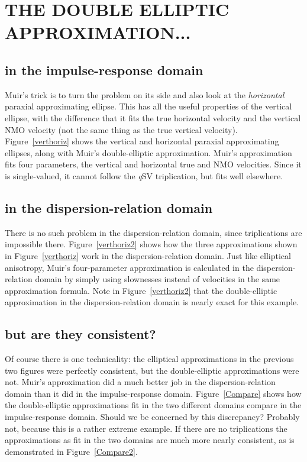 \section{THE DOUBLE ELLIPTIC APPROXIMATION...}
\subsection{in the impulse-response domain}
Muir's trick is to turn the problem on its side and also look at the
{\em horizontal\/} paraxial approximating ellipse. This has all the
useful properties of the vertical ellipse, with the difference
that it fits the true horizontal velocity and the vertical NMO velocity
(not the same thing as the true vertical velocity).
Figure~\ref{verthoriz} shows the vertical and horizontal
paraxial approximating ellipses, along with
Muir's double-elliptic approximation. Muir's approximation fits
four parameters, the vertical and horizontal true and NMO velocities.
Since it is single-valued, it cannot follow the {\sl q}SV triplication,
but fits well elsewhere.

\subsection{in the dispersion-relation domain}
There is no such problem in the dispersion-relation domain, since
triplications are impossible there.
Figure~\ref{verthoriz2} shows how the three approximations shown
in Figure~\ref{verthoriz} work in the dispersion-relation domain.
Just like elliptical anisotropy,
Muir's four-parameter approximation is calculated
in the dispersion-relation domain
by simply using slownesses instead of velocities
in the same approximation formula.
Note in Figure~\ref{verthoriz2} that the
double-elliptic approximation in the dispersion-relation domain
is nearly exact for this example.

\subsection{but are they consistent?}
Of course there is one technicality: the elliptical approximations in
the previous two figures were perfectly consistent, but the double-elliptic
approximations were not. Muir's approximation did a much better job
in the dispersion-relation domain than it did in the impulse-response domain.
Figure~\ref{Compare} shows how the double-elliptic approximations
fit in the two different domains compare in the impulse-response domain.
Should we be concerned by this discrepancy?
Probably not, because this is a rather extreme example.
If there are no triplications the
approximations as fit in the two domains are much more nearly consistent,
as is demonstrated in Figure~\ref{Compare2}.

